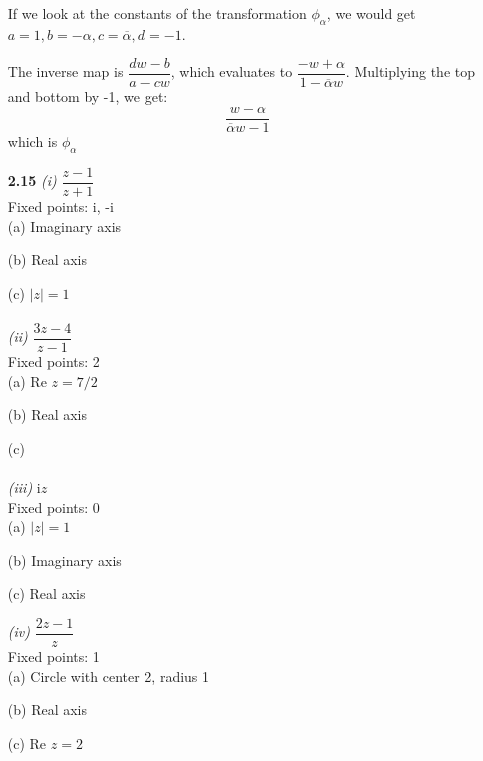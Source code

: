 \begin{enumerate}
If we look at the constants of the transformation $\phi_\alpha$, we would get $a=1, b=-\alpha, c=\overline{\alpha}, d=-1$. 

The inverse map is $\dfrac{dw-b}{a-cw}$, which evaluates to $\dfrac{-w+\alpha}{1-\overline{\alpha}w}$. Multiplying the top and bottom by -1, we get:
\[\dfrac{w-\alpha}{\overline{\alpha}w-1}\]
which is $\phi_\alpha$
\item[\textbf{2.15}]
\textit{(i)} $\dfrac{z-1}{z+1}$  \\
Fixed points: i, -i \\

\quad (a) Imaginary axis

\quad (b) Real axis

\quad (c) $|z| = 1$ 
\\\\
\textit{(ii)} $\dfrac{3z-4}{z-1}$ \\
Fixed points: 2 \\

\quad (a) Re $z = 7/2$

\quad (b) Real axis

\quad (c) 
\\\\
\textit{(iii)} i$z$ \\
Fixed points: 0 \\

\quad (a) $|z| = 1$

\quad (b) Imaginary axis

\quad (c) Real axis

\textit{(iv)} $\dfrac{2z-1}{z}$ \\
Fixed points: 1 \\

\quad (a) Circle with center 2, radius 1

\quad (b) Real axis

\quad (c) Re $z = 2$
\end{enumerate}
